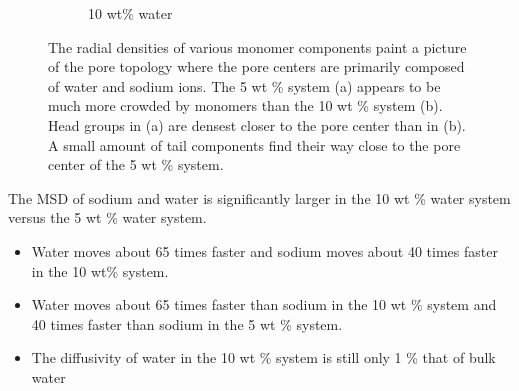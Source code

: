 \documentclass{article}
\begin{document}
\begin{figure}[!htb]
\begin{subfigure}{0.45\textwidth}
  \caption{10 wt\% water}\label{fig:component_density_10wt}
  \end{subfigure}
  \caption{The radial densities of various monomer components paint a picture of the
  pore topology where the pore centers are primarily composed of water and sodium ions.
  The 5 wt \% system (a) appears to be much more crowded by monomers than the 
  10 wt \% system (b). Head groups in (a) are densest closer to the pore center than
  in (b). A small amount of tail components find their way close to the pore center 
  of the 5 wt \% system. }\label{fig:component_densities}
  \end{figure}
  
  The MSD of sodium and water is significantly larger in the 10 wt \% water system
  versus the 5 wt \% water system.
  \begin{itemize}
    \item Water moves about 65 times faster and sodium moves about 40 times faster
    in the 10 wt\% system.
    \item Water moves about 65 times faster than sodium in the 10 wt \% system and
    40 times faster than sodium in the 5 wt \% system. %
    \item The diffusivity of water in the 10 wt \% system is still only 1 \% that of 
    bulk water %
  \end{itemize}
  
  
  
\end{document}

